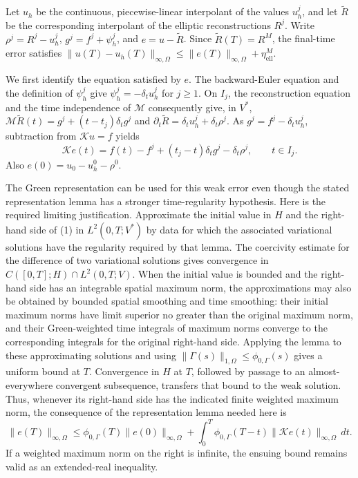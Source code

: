 \documentclass[11pt]{article}
\begin{document}
Let \(u_h\) be the continuous, piecewise-linear interpolant of the values \(u_h^j\), and let \(\widetilde R\) be the corresponding interpolant of the elliptic reconstructions \(R^j\). Write \(\rho^j=R^j-u_h^j\), \(g^j=f^j+\psi_h^j\), and \(e=u-\widetilde R\). Since \(\widetilde R(T)=R^M\), the final-time error satisfies \(\|u(T)-u_h(T)\|_{\infty,\Omega}\leq\|e(T)\|_{\infty,\Omega}+\eta_{\mathrm{ell}}^M\).

We first identify the equation satisfied by \(e\). The backward-Euler equation and the definition of \(\psi_h^j\) give \(\psi_h^j=-\delta_tu_h^j\) for \(j\geq1\). On \(I_j\), the reconstruction equation and the time independence of \(\mathcal M\) consequently give, in \(V^*\), \(\mathcal M\widetilde R(t)=g^j+(t-t_j)\delta_tg^j\) and \(\partial_t\widetilde R=\delta_tu_h^j+\delta_t\rho^j\). As \(g^j=f^j-\delta_tu_h^j\), subtraction from \(\mathcal Ku=f\) yields
\[
\mathcal Ke(t)=f(t)-f^j+(t_j-t)\delta_tg^j-\delta_t\rho^j,\qquad t\in I_j.\tag{1}
\]
Also \(e(0)=u_0-u_h^0-\rho^0\).

The Green representation can be used for this weak error even though the stated representation lemma has a stronger time-regularity hypothesis. Here is the required limiting justification. Approximate the initial value in \(H\) and the right-hand side of (1) in \(L^2(0,T;V^*)\) by data for which the associated variational solutions have the regularity required by that lemma. The coercivity estimate for the difference of two variational solutions gives convergence in \(C([0,T];H)\cap L^2(0,T;V)\). When the initial value is bounded and the right-hand side has an integrable spatial maximum norm, the approximations may also be obtained by bounded spatial smoothing and time smoothing: their initial maximum norms have limit superior no greater than the original maximum norm, and their Green-weighted time integrals of maximum norms converge to the corresponding integrals for the original right-hand side. Applying the lemma to these approximating solutions and using \(\|\Gamma(s)\|_{1,\Omega}\leq\phi_{0,\Gamma}(s)\) gives a uniform bound at \(T\). Convergence in \(H\) at \(T\), followed by passage to an almost-everywhere convergent subsequence, transfers that bound to the weak solution. Thus, whenever its right-hand side has the indicated finite weighted maximum norm, the consequence of the representation lemma needed here is
\[
\|e(T)\|_{\infty,\Omega}\leq\phi_{0,\Gamma}(T)\|e(0)\|_{\infty,\Omega}+\int_0^T\phi_{0,\Gamma}(T-t)\|\mathcal Ke(t)\|_{\infty,\Omega}\,dt.\tag{2}
\]
If a weighted maximum norm on the right is infinite, the ensuing bound remains valid as an extended-real inequality.
\end{document}
